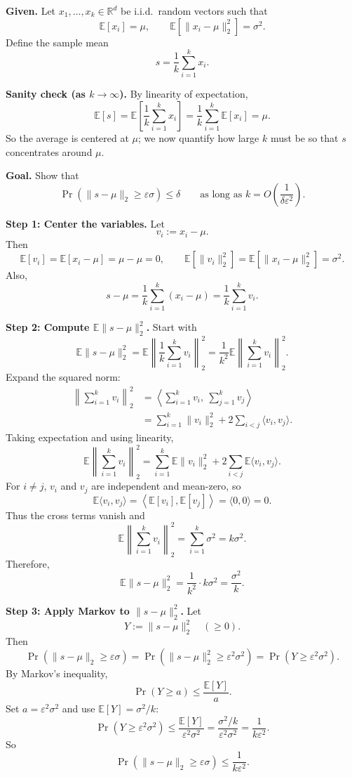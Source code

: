 \documentclass[10pt]{article}
\newcommand{\E}{\mathbb{E}}
\begin{document}


\textbf{Given.}
Let $x_1,\dots,x_k \in \mathbb{R}^d$ be i.i.d.\ random vectors such that
\[
\E[x_i]=\mu,
\qquad
\E\!\left[\|x_i-\mu\|_2^2\right]=\sigma^2.
\]
Define the sample mean
\[
s=\frac{1}{k}\sum_{i=1}^k x_i.
\]

\textbf{Sanity check (as $k\to\infty$).}
By linearity of expectation,
\[
\E[s]=\E\!\left[\frac{1}{k}\sum_{i=1}^k x_i\right]
=\frac{1}{k}\sum_{i=1}^k \E[x_i]
=\mu.
\]
So the average is centered at $\mu$; we now quantify how large $k$ must be so that $s$ concentrates around $\mu$.

\textbf{Goal.}
Show that
\[
\Pr\!\left(\|s-\mu\|_2 \ge \varepsilon\sigma\right)\le \delta
\qquad
\text{as long as }
k = O\!\left(\frac{1}{\delta\varepsilon^2}\right).
\]

\medskip
\textbf{Step 1: Center the variables.}
Let
\[
v_i := x_i-\mu.
\]
Then
\[
\E[v_i]=\E[x_i-\mu]=\mu-\mu=0,
\qquad
\E\!\left[\|v_i\|_2^2\right]=\E\!\left[\|x_i-\mu\|_2^2\right]=\sigma^2.
\]
Also,
\[
s-\mu
=
\frac{1}{k}\sum_{i=1}^k (x_i-\mu)
=
\frac{1}{k}\sum_{i=1}^k v_i.
\]

\medskip
\textbf{Step 2: Compute $\E\|s-\mu\|_2^2$.}
Start with
\[
\E\|s-\mu\|_2^2
=
\E\left\|\frac{1}{k}\sum_{i=1}^k v_i\right\|_2^2
=
\frac{1}{k^2}\E\left\|\sum_{i=1}^k v_i\right\|_2^2.
\]
Expand the squared norm:
\begin{align*}
\left\|\sum_{i=1}^k v_i\right\|_2^2
&=
\left\langle \sum_{i=1}^k v_i,\ \sum_{j=1}^k v_j \right\rangle \\
&=
\sum_{i=1}^k \|v_i\|_2^2
+
2\sum_{i<j}\langle v_i,v_j\rangle.
\end{align*}
Taking expectation and using linearity,
\[
\E\left\|\sum_{i=1}^k v_i\right\|_2^2
=
\sum_{i=1}^k \E\|v_i\|_2^2
+
2\sum_{i<j}\E\langle v_i,v_j\rangle.
\]
For $i\neq j$, $v_i$ and $v_j$ are independent and mean-zero, so
\[
\E\langle v_i,v_j\rangle
=
\left\langle \E[v_i],\E[v_j]\right\rangle
=
\langle 0,0\rangle
=0.
\]
Thus the cross terms vanish and
\[
\E\left\|\sum_{i=1}^k v_i\right\|_2^2
=
\sum_{i=1}^k \sigma^2
=
k\sigma^2.
\]
Therefore,
\[
\boxed{
\E\|s-\mu\|_2^2
=
\frac{1}{k^2}\cdot k\sigma^2
=
\frac{\sigma^2}{k}.
}
\]

\medskip
\textbf{Step 3: Apply Markov to $\|s-\mu\|_2^2$.}
Let
\[
Y := \|s-\mu\|_2^2 \quad(\ge 0).
\]
Then
\[
\Pr\!\left(\|s-\mu\|_2 \ge \varepsilon\sigma\right)
=
\Pr\!\left(\|s-\mu\|_2^2 \ge \varepsilon^2\sigma^2\right)
=
\Pr\!\left(Y \ge \varepsilon^2\sigma^2\right).
\]
By Markov's inequality,
\[
\Pr(Y\ge a)\le \frac{\E[Y]}{a}.
\]
Set $a=\varepsilon^2\sigma^2$ and use $\E[Y]=\sigma^2/k$:
\[
\Pr\!\left(Y \ge \varepsilon^2\sigma^2\right)
\le
\frac{\E[Y]}{\varepsilon^2\sigma^2}
=
\frac{\sigma^2/k}{\varepsilon^2\sigma^2}
=
\frac{1}{k\varepsilon^2}.
\]
So
\[
\boxed{
\Pr\!\left(\|s-\mu\|_2 \ge \varepsilon\sigma\right)
\le
\frac{1}{k\varepsilon^2}.
}
\]
\end{document}
